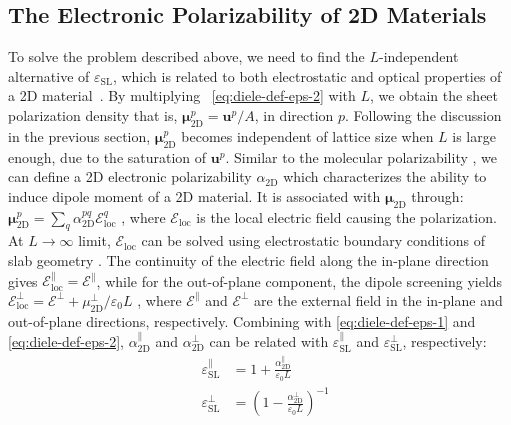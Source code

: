 \subsection{The Electronic Polarizability of 2D Materials}
\label{sec:diel-electr-polar-2d}

To solve the problem described above, we need to find the
$L$-independent alternative of $\varepsilon_{\mathrm{SL}}$, which is
related to both electrostatic and optical properties of a 2D
material~\autocite{Matthes_2016_effective_PRB}. By multiplying ~\autoref{eq:diele-def-eps-2}
with $L$, we obtain the sheet polarization density that is,
$\symbf{\mu}_{\mathrm{2D}}^{p} =\symbf{u}^{p}/A$, in
direction $p$. Following the discussion in the previous section,
$\symbf{\mu}_{\mathrm{2D}}^{p}$ becomes independent of lattice
size when $L$ is large enough, due to the saturation of
$\symbf{u}^{p}$.
%
Similar to the molecular polarizability \autocite{Israelachvili_2011_book}, we
can define a 2D electronic polarizability $\alpha_{\mathrm{2D}}$ which
characterizes the ability to induce dipole moment of a 2D material. It
is associated with $\symbf{\mu}_{\mathrm{2D}}$ through:
$\symbf{\mu}_{\mathrm{2D}}^{p} = \sum_{q}
\alpha_{\mathrm{2D}}^{pq} \mathscr{E}_{\mathrm{loc}}^{q}$
\autocite{Tobik_2004_perp_polariz}, where $\mathscr{E}_{\mathrm{loc}}$ is the local
electric field causing the polarization. At $L \rightarrow \infty$
limit, $\mathscr{E}_{\mathrm{loc}}$ can be solved using electrostatic boundary
conditions of slab geometry \autocite{Markel_2016_EMT}. The continuity of the
electric field along the in-plane direction gives
$\mathscr{E}^{\parallel}_{\mathrm{loc}}=\mathscr{E}^{\parallel}$,
while for the out-of-plane component, the dipole screening yields
$\mathscr{E}_{\mathrm{loc}}^{\perp}=\mathscr{E}^{\perp}+ \mu_{\mathrm{2D}}^{\perp}/\varepsilon_{0}L$
\autocite{Meyer_2001_dipole_slab,Tobik_2004_perp_polariz}, where
$\mathscr{E}^{\parallel}$ and $\mathscr{E}^{\perp}$ are the
external field in the in-plane and out-of-plane directions,
respectively. Combining with \autoref{eq:diele-def-eps-1} and
\autoref{eq:diele-def-eps-2},
$\alpha_{\mathrm{2D}}^{\parallel}$ and $\alpha_{\mathrm{2D}}^{\perp}$
can be related with $\varepsilon_{\mathrm{SL}}^{\parallel}$ and
$\varepsilon_{\mathrm{SL}}^{\perp}$, respectively:
%
%
\begin{subequations}
\begin{eqnarray}
  \label{eq:diele-alpha-para-def}
  &\varepsilon_{\mathrm{SL}}^{\parallel} &= 1 + \frac{\alpha_{\mathrm{2D}}^{\parallel}}{\varepsilon_{0}L}\\
  \label{eq:diele-alpha-perp-def}
  &\varepsilon_{\mathrm{SL}}^{\perp} &= \left(1 - {\displaystyle \frac{\alpha_{\mathrm{2D}}^{\perp}}{\varepsilon_{\mathrm{0}} L}} \right)^{-1}
\end{eqnarray}
\end{subequations}

